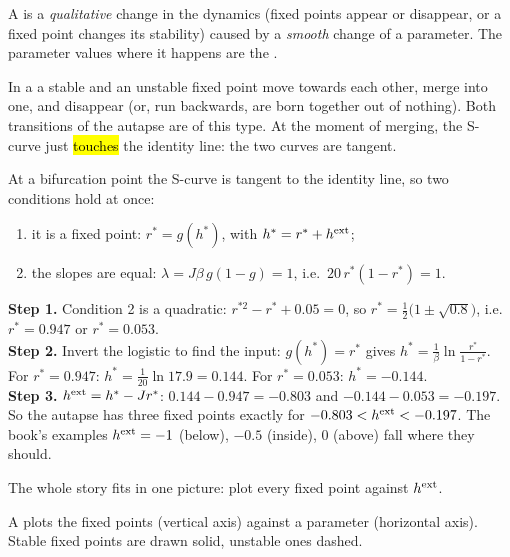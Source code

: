 \begin{defn}[Bifurcation]
A  is a \emph{qualitative} change in the dynamics (fixed points appear or disappear, or a fixed point changes its stability) caused by a \emph{smooth} change of a parameter.
The parameter values where it happens are the .
\end{defn}

\begin{defn}
In a  a stable and an unstable fixed point move towards each other, merge into one, and disappear (or, run backwards, are born together out of nothing).
Both transitions of the autapse are of this type. At the moment of merging, the S-curve just \hl{touches} the identity line: the two curves are tangent.
\end{defn}

\begin{example}[Computing the two bifurcation points ($\theta=0$, $\beta=20$, $J=1$)]
At a bifurcation point the S-curve is tangent to the identity line, so two conditions hold at once:
\begin{enumerate}
  \item it is a fixed point: $r^* = g(h^*)$, with $h^* = r^*+h^{\text{ext}}$;
  \item the slopes are equal: $\lambda = J\beta\,g(1-g) = 1$, i.e.\ $20\,r^*(1-r^*) = 1$.
\end{enumerate}
\textbf{Step 1.} Condition 2 is a quadratic: $r^{*2} - r^* + 0.05 = 0$, so $r^* = \tfrac12\big(1\pm\sqrt{0.8}\big)$, i.e.\ $r^* = 0.947$ or $r^* = 0.053$.\\
\textbf{Step 2.} Invert the logistic to find the input: $g(h^*)=r^*$ gives $h^* = \frac{1}{\beta}\ln\frac{r^*}{1-r^*}$. For $r^*=0.947$: $h^* = \frac{1}{20}\ln 17.9 = 0.144$. For $r^*=0.053$: $h^*=-0.144$.\\
\textbf{Step 3.} $h^{\text{ext}} = h^* - Jr^*$: \;$0.144-0.947 = \mathbf{-0.803}$ \;and\; $-0.144-0.053 = \mathbf{-0.197}$.\\[2pt]
So the autapse has three fixed points exactly for $-0.803 < h^{\text{ext}} < -0.197$. The book's examples $h^{\text{ext}}=-1$ (below), $-0.5$ (inside), $0$ (above) fall where they should.
\end{example}

The whole story fits in one picture: plot every fixed point against $h^{\text{ext}}$.
\begin{defn}
A  plots the fixed points (vertical axis) against a parameter (horizontal axis). Stable fixed points are drawn solid, unstable ones dashed.
\end{defn}

